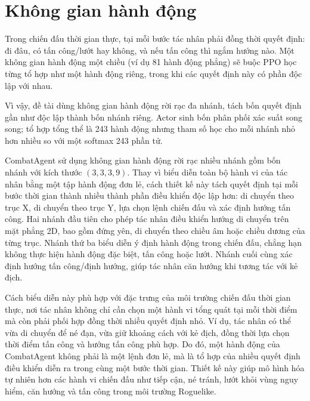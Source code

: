 \section{Không gian hành động}

Trong chiến đấu thời gian thực, tại mỗi bước tác nhân phải đồng thời quyết định: đi đâu, có tấn công/lướt hay không, và nếu tấn công thì ngắm hướng nào. Một không gian hành động một chiều (ví dụ 81 hành động phẳng) sẽ buộc PPO học từng tổ hợp như một hành động riêng, trong khi các quyết định này có phần độc lập với nhau.

Vì vậy, đề tài dùng không gian hành động rời rạc đa nhánh, tách bốn quyết định gần như độc lập thành bốn nhánh riêng. Actor sinh bốn phân phối xác suất song song; tổ hợp tổng thể là 243 hành động nhưng tham số học cho mỗi nhánh nhỏ hơn nhiều so với một softmax 243 phần tử.

CombatAgent sử dụng không gian hành động rời rạc nhiều nhánh gồm bốn nhánh với kích thước $(3,3,3,9)$. Thay vì biểu diễn toàn bộ hành vi của tác nhân bằng một tập hành động đơn lẻ, cách thiết kế này tách quyết định tại mỗi bước thời gian thành nhiều thành phần điều khiển độc lập hơn: di chuyển theo trục X, di chuyển theo trục Y, lựa chọn lệnh chiến đấu và xác định hướng tấn công. Hai nhánh đầu tiên cho phép tác nhân điều khiển hướng di chuyển trên mặt phẳng 2D, bao gồm đứng yên, di chuyển theo chiều âm hoặc chiều dương của từng trục. Nhánh thứ ba biểu diễn ý định hành động trong chiến đấu, chẳng hạn không thực hiện hành động đặc biệt, tấn công hoặc lướt. Nhánh cuối cùng xác định hướng tấn công/định hướng, giúp tác nhân căn hướng khi tương tác với kẻ địch.

Cách biểu diễn này phù hợp với đặc trưng của môi trường chiến đấu thời gian thực, nơi tác nhân không chỉ cần chọn một hành vi tổng quát tại mỗi thời điểm mà còn phải phối hợp đồng thời nhiều quyết định nhỏ. Ví dụ, tác nhân có thể vừa di chuyển để né đạn, vừa giữ khoảng cách với kẻ địch, đồng thời lựa chọn thời điểm tấn công và hướng tấn công phù hợp. Do đó, một hành động của CombatAgent không phải là một lệnh đơn lẻ, mà là tổ hợp của nhiều quyết định điều khiển diễn ra trong cùng một bước thời gian. Thiết kế này giúp mô hình hóa tự nhiên hơn các hành vi chiến đấu như tiếp cận, né tránh, lướt khỏi vùng nguy hiểm, căn hướng và tấn công trong môi trường Roguelike.

